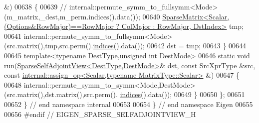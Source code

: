 \begin{DoxyCode}
       &)
00638   \{
00639     \textcolor{comment}{// internal::permute\_symm\_to\_fullsymm<Mode>(m\_matrix,\_dest,m\_perm.indices().data());}
00640     
      \hyperlink{group___sparse_core___module_class_eigen_1_1_sparse_matrix}{SparseMatrix<Scalar,(Options&RowMajor)==RowMajor ? ColMajor : RowMajor, DstIndex>}
       tmp;
00641     internal::permute\_symm\_to\_fullsymm<Mode>(src.matrix(),tmp,src.perm().\hyperlink{group___core___module_a2f1ab379207fcd1ceb33941e25cf50c2}{indices}().data());
00642     dst = tmp;
00643   \}
00644   
00645   \textcolor{keyword}{template}<\textcolor{keyword}{typename} DestType,\textcolor{keywordtype}{unsigned} \textcolor{keywordtype}{int} DestMode>
00646   \textcolor{keyword}{static} \textcolor{keywordtype}{void} run(\hyperlink{group___sparse_core___module_class_eigen_1_1_sparse_self_adjoint_view}{SparseSelfAdjointView<DestType,DestMode>}& dst, \textcolor{keyword}{
      const} SrcXprType &src, \textcolor{keyword}{const} 
      \hyperlink{struct_eigen_1_1internal_1_1assign__op}{internal::assign\_op<Scalar,typename MatrixType::Scalar>}
       &)
00647   \{
00648     internal::permute\_symm\_to\_symm<Mode,DestMode>(src.matrix(),dst.matrix(),src.perm().
      \hyperlink{group___core___module_a2f1ab379207fcd1ceb33941e25cf50c2}{indices}().data());
00649   \}
00650 \};
00651 
00652 \} \textcolor{comment}{// end namespace internal}
00653 
00654 \} \textcolor{comment}{// end namespace Eigen}
00655 
00656 \textcolor{preprocessor}{#endif // EIGEN\_SPARSE\_SELFADJOINTVIEW\_H}
\end{DoxyCode}

